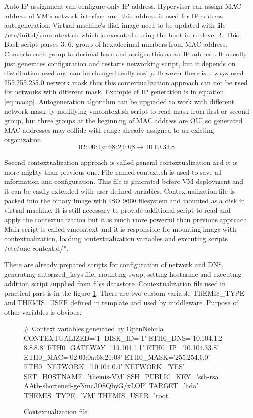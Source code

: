 Auto \Ac{IP} assignment can configure only \Ac{IP} address. Hypervisor can assign \Ac{MAC} address of \Ac{VM}'s network interface and this address is used for \Ac{IP} address autogeneration. Virtual machine's disk image need to be updated with file /etc/init.d/vmcontext.sh which is executed during the boot in runlevel 2. This \Ac{Bash} script parses 3.-6. group of hexadecimal numbers from \Ac{MAC} address. Converts each group to decimal base and assigns this as an \Ac{IP} address. It usually just generates configuration and restarts networking script, but it depends on distribution used and can be changed really easily.
However there is always used 255.255.255.0 network mask thus this contextualization approach can not be used for networks with different mask. Example of \Ac{IP} generation is in equation \ref{eq:macip}. Autogeneration algorithm can be upgraded to work with different network mask by modifying vmcontext.sh script to read mask from first or second group, but three groups at the beginning of \Ac{MAC} address are \Ac{OUI} so generated \Ac{MAC} addresses may collide with range already assigned to an existing organization.
\begin{equation}
	\label{eq:macip}
	02:00:\underline{0a}:\underline{68}:\underline{21}:\underline{08} \rightarrow 10.10.33.8
\end{equation}

Second contextualization approach is called general contextualization and it is more mighty than previous one. File named context.sh is used to save all information and configuration. This file is generated before \Ac{VM} deployment and it can be easily extended with user defined variables.
Contextualization file is packed into the binary image with ISO 9660 filesystem and mounted as a disk in virtual machine.
It is still necessary to provide additional script to read and apply the contextualization but it is much more powerful than previous approach. Main script is called vmcontext and it is responsible for mounting image with contextualization, loading contextualization variables and executing scripts /etc/one-context.d/*. 

There are already prepared scripts for configuration of network and \Ac{DNS}, generating autorized\_keys file, mounting swap, setting hostname and executing addition script supplied from files datastore. Contextualization file used in practical part is in the figure \ref{code:contextualization}. There are two custom variable THEMIS\_TYPE and THEMIS\_USER defined in template and used by middleware. Purpose of other variables is obvious.

\begin{figure}[htb]
\caption{Contextualization file}
\label{code:contextualization}
\begin{verbatimtab}
# Context variables generated by OpenNebula
CONTEXTUALIZED='1'
DISK_ID='1'
ETH0_DNS='10.104.1.2 8.8.8.8'
ETH0_GATEWAY='10.104.1.1'
ETH0_IP='10.104.33.8'
ETH0_MAC='02:00:0a:68:21:08'
ETH0_MASK='255.254.0.0'
ETH0_NETWORK='10.104.0.0'
NETWORK='YES'
SET_HOSTNAME='themis-VM'
SSH_PUBLIC_KEY='ssh-rsa AAtb-shortened-geNmcJO8QbyG/xLOP'
TARGET='hda'
THEMIS_TYPE='VM'
THEMIS_USER='root'
\end{verbatimtab}
\end{figure}
